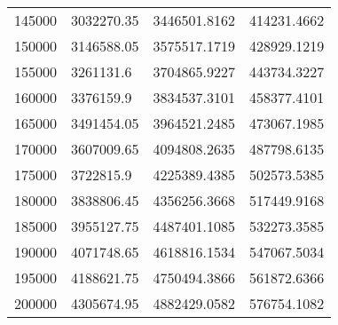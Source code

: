 \begin{tabular}{llll}
145000 & 3032270.35 & 3446501.8162 & 414231.4662 \\ 
150000 & 3146588.05 & 3575517.1719 & 428929.1219 \\ 
155000 & 3261131.6 & 3704865.9227 & 443734.3227 \\ 
160000 & 3376159.9 & 3834537.3101 & 458377.4101 \\ 
165000 & 3491454.05 & 3964521.2485 & 473067.1985 \\ 
170000 & 3607009.65 & 4094808.2635 & 487798.6135 \\ 
175000 & 3722815.9 & 4225389.4385 & 502573.5385 \\ 
180000 & 3838806.45 & 4356256.3668 & 517449.9168 \\ 
185000 & 3955127.75 & 4487401.1085 & 532273.3585 \\ 
190000 & 4071748.65 & 4618816.1534 & 547067.5034 \\ 
195000 & 4188621.75 & 4750494.3866 & 561872.6366 \\ 
200000 & 4305674.95 & 4882429.0582 & 576754.1082 \\ 
\hline 
\end{tabular}